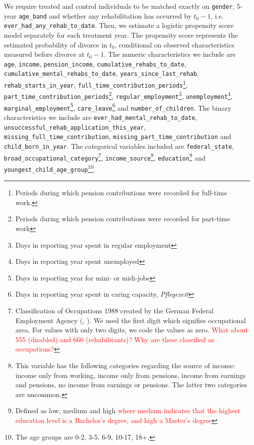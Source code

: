 \documentclass[a4paper,12pt]{article}
\theoremstyle{plain}
\theoremstyle{definition}
\theoremstyle{TheoremNum}
\theoremstyle{CorollaryNum}
\theoremstyle{PropositionNum}
\theoremstyle{TheoremNum}
\begin{document}
We require treated and control individuals to be matched exactly on \texttt{gender}, 5-year \texttt{age\_band} and whether any rehabilitation has occurred by $t_{0}-1$, i.e. \texttt{ever\_had\_any\_rehab\_to\_date}. Then, we estimate a logistic propensity score model separately for each treatment year. The propensity score represents the estimated probability of divorce in $t_0$, conditional on observed characteristics measured before divorce at $t_{0}-1$. The numeric characteristics we include are \texttt{age}, \texttt{income}, \texttt{pension\_income}, \texttt{cumulative\_rehabs\_to\_date}, \texttt{cumulative\_mental\_rehabs\_to\_date}, \texttt{years\_since\_last\_rehab}, \texttt{rehab\_starts\_in\_year}, \texttt{full\_time\_contribution\_periods}\footnote{Periods during which pension contributions were recorded for full-time work.}, \texttt{part\_time\_contribution\_periods}\footnote{Periods during which pension contributions were recorded for part-time work}, \texttt{regular\_employment}\footnote{Days in reporting year spent in regular employment}, \texttt{unemployment}\footnote{Days in reporting year spent unemployed}, \texttt{marginal\_employment}\footnote{Days in reporting year for mini- or midi-jobs}, \texttt{care\_leave}\footnote{Days in reporting year spent in caring capacity, \textit{Pflegezeit}} and \texttt{number\_of\_children}. The binary characteristics we include are \texttt{ever\_had\_mental\_rehab\_to\_date}, \texttt{unsuccessful\_rehab\_application\_this\_year}, \texttt{missing\_full\_time\_contribution}, \texttt{missing\_part\_time\_contribution} and \texttt{child\_born\_in\_year}. The categorical variables included are \texttt{federal\_state}, \texttt{broad\_occupational\_category}\footnote{Classification of Occupations 1988 created by the German Federal Employment Agency (\citeauthor{bibb_kldb1988}, \citeyear{bibb_kldb1988}). We used the first digit which signifies occupational area. For values with only two digits, we code the values as zero. \textcolor{red}{What about 555 (disabled) and 666 (rehabilitants)? Why are these classified as occupations?}}, \texttt{income\_source}\footnote{This variable has the following categories regarding the source of income: income only from working, income only from pensions, income from earnings and pensions, no income from earnings or pensions. The latter two categories are uncommon.}, \texttt{education}\footnote{Defined as low, medium and high \textcolor{red}{where medium indicates that the highest education level is a Bachelor's degree, and high a Master's degree}} and \texttt{youngest\_child\_age\_group}\footnote{The age groups are 0-2, 3-5, 6-9, 10-17, 18+.}.
\end{document}
